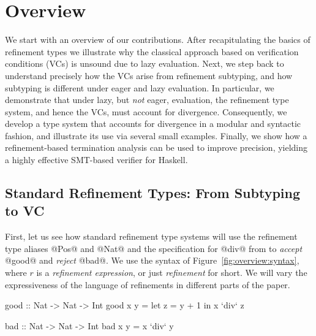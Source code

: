 \section{Overview}\label{sec:overview}

We start with an overview of our contributions. 
%
After recapitulating the basics of refinement types
we illustrate why the classical approach based on 
verification conditions (VCs) is unsound due to 
lazy evaluation.  
%
Next, we step back to understand precisely how the 
VCs arise from refinement subtyping, and how subtyping
is different under eager and lazy evaluation. 
In particular, we demonstrate that under lazy, but 
\emph{not} eager, evaluation, the refinement type 
system, and hence the VCs, must account for divergence.
%
Consequently, we develop a type system that accounts 
for divergence in a modular and syntactic fashion, 
and illustrate its use via several small examples.
%
Finally, we show how a refinement-based termination
analysis can be used to improve precision, yielding 
a highly effective SMT-based verifier for Haskell.

\subsection{Standard Refinement Types: From Subtyping to VC}\label{subsec:vc}

First, let us see how standard refinement type systems 
\cite{LiquidPLDI08, Knowles10} will 
use
the refinement type aliases @Pos@ and @Nat@ 
and the specification for @div@ from 
%
to \emph{accept} @good@ and
\emph{reject} @bad@.
We use the syntax of Figure~\ref{fig:overview:syntax}, where $r$ is a
\emph{refinement expression}, or just \emph{refinement} for short.
We will vary the expressiveness of the language of refinements in
different parts of the paper.
%
\begin{code}
    good     :: Nat -> Nat -> Int
    good x y = let z = y + 1 in x `div` z

    bad      :: Nat -> Nat -> Int
    bad x y  = x `div` y
\end{code}

